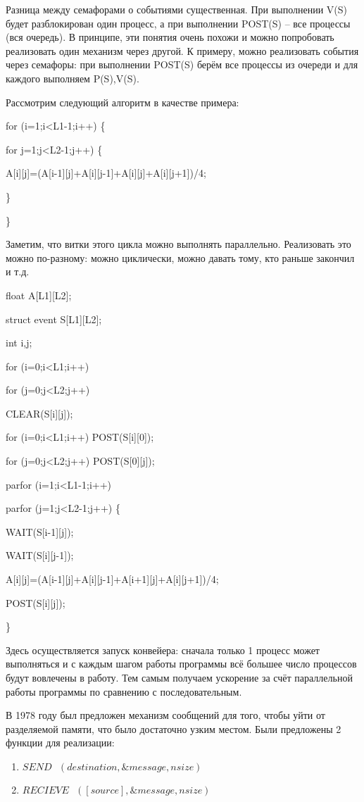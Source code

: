 \documentclass[a4paper,12pt]{article}
\begin{document}
	Разница между семафорами о событиями существенная. При выполнении V(S) будет разблокирован
один процесс, а при выполнении POST(S) -- все процессы (вся очередь). В принципе, эти понятия
очень похожи и можно попробовать реализовать один механизм через другой. К примеру, можно
реализовать события через семафоры: при выполнении POST(S) берём все процессы из очереди и для
каждого выполняем P(S),V(S).

	Рассмотрим следующий алгоритм в качестве примера:
	
	{\bf {for (i=1;i<L1-1;i++) \{
	
		\qquad for j=1;j<L2-1;j++) \{
		
			\qquad \qquad A[i][j]=(A[i-1][j]+A[i][j-1]+A[i][j]+A[i][j+1])/4;
			
		\qquad \}
		
	\} }}

	Заметим, что витки этого цикла можно выполнять параллельно. Реализовать это можно 
по-разному: можно циклически, можно давать тому, кто раньше закончил и т.д.

	{\bf {float A[L1][L2];
	
		struct event S[L1][L2];
		
		int i,j;
		
		for (i=0;i<L1;i++)
		
			\qquad for (j=0;j<L2;j++)
			
				\qquad \qquad CLEAR(S[i][j]);
				
	for (i=0;i<L1;i++) POST(S[i][0]);
	
		for (j=0;j<L2;j++) POST(S[0][j]);
		
		parfor (i=1;i<L1-1;i++)
		
			\qquad parfor (j=1;j<L2-1;j++) \{
			
				\qquad \qquad WAIT(S[i-1][j]);
				
				\qquad \qquad WAIT(S[i][j-1]);
				
				\qquad \qquad A[i][j]=(A[i-1][j]+A[i][j-1]+A[i+1][j]+A[i][j+1])/4;
				
				\qquad \qquad POST(S[i][j]);
				
			\qquad \} }}
	
	Здесь осуществляется запуск конвейера: сначала только 1 процесс может выполняться и с 
каждым шагом работы программы всё большее число процессов будут вовлечены в работу. Тем самым
получаем ускорение за счёт параллельной работы программы по сравнению с последовательным.

	В 1978 году был предложен механизм сообщений для того, чтобы уйти от разделяемой памяти, что
было достаточно узким местом. Были предложены 2 функции для реализации:
	\begin{enumerate}
		\item $SEND\mbox{ }(destination,\&message,nsize)$
		\item $RECIEVE\mbox{ }([source],\&message,nsize)$
	\end{enumerate}
	
\end{document}
